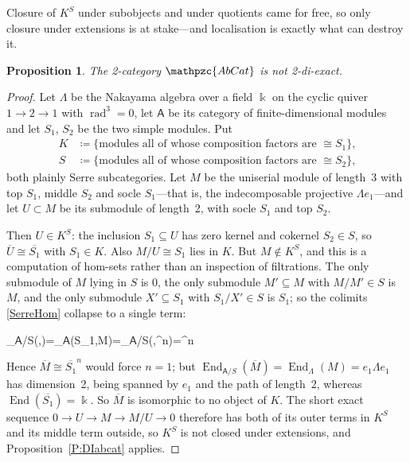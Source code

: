 \documentclass[reqno,a4paper]{amsart}
\numberwithin{equation}{section}
\theoremstyle{plain}
\newtheorem{proposition}[subsection]{Proposition}
\theoremstyle{definition}
\def\nameit#1{\textrm{#1}~}
\def\prox{\nameit{Proposition}}
\newenvironment{eqD*}{\begin{equation*}}{\end{equation*}\ignorespacesafterend}
\newcommand{\iso}{\cong}
\newcommand{\ov}[1]{\overline{#1}}
\newcommand{\catfont}[1]{\ensuremath{\mathpzc{#1}}\xspace}
\newcommand{\onecat}[1]{\ensuremath{\mathsf{#1}}\xspace}
\newcommand{\AbCat}{\catfont{AbCat}}
\renewcommand{\1}{\onecat{1}}
\DeclareMathOperator{\Hom}{Hom}
\DeclareMathOperator{\End}{End}
\begin{document}
Closure of \(K^{S}\) under subobjects and under quotients came for free, so only closure under extensions is at stake---and localisation is exactly what can destroy it.

\begin{proposition}\label{P:AbCatFails}
	The 2-category \(\AbCat\) is not 2-di-exact.
\end{proposition}

\begin{proof}
	Let \(\Lambda\) be the Nakayama algebra over a field \(\Bbbk\) on the cyclic quiver \(1\to2\to1\) with \(\operatorname{rad}^{3}=0\), let \(\onecat{A}\) be its category of finite-dimensional modules and let \(S_{1}\), \(S_{2}\) be the two simple modules. Put
	\begin{align*}
		K & \coloneq\{\text{modules all of whose composition factors are \(\iso S_{1}\)}\}\text{,} \\
		S & \coloneq\{\text{modules all of whose composition factors are \(\iso S_{2}\)}\}\text{,}
	\end{align*}
	both plainly Serre subcategories. Let \(M\) be the uniserial module of length~3 with top \(S_{1}\), middle \(S_{2}\) and socle \(S_{1}\)---that is, the indecomposable projective \(\Lambda e_{1}\)---and let \(U\subset M\) be its submodule of length~2, with socle \(S_{1}\) and top \(S_{2}\).

	Then \(U\in K^{S}\): the inclusion \(S_{1}\subseteq U\) has zero kernel and cokernel \(S_{2}\in S\), so \(\ov{U}\iso\ov{S_{1}}\) with \(S_{1}\in K\). Also \(M/U\iso S_{1}\) lies in \(K\). But \(M\notin K^{S}\), and this is a computation of hom-sets rather than an inspection of filtrations. The only submodule of \(M\) lying in \(S\) is \(0\), the only submodule \(M'\subseteq M\) with \(M/M'\in S\) is \(M\), and the only submodule \(X'\subseteq S_{1}\) with \(S_{1}/X'\in S\) is \(S_{1}\); so the colimits \eqref{SerreHom} collapse to a single term:
	\begin{eqD*}
		\Hom_{\onecat{A}/S}(\ov{S_{1}},\ov{M})=\Hom_{\onecat{A}}(S_{1},M)=\Bbbk\text{,}\qquad\Hom_{\onecat{A}/S}(\ov{S_{1}},\ov{S_{1}}^{n})=\Bbbk^{n}
	\end{eqD*}
	Hence \(\ov{M}\iso\ov{S_{1}}^{n}\) would force \(n=1\); but \(\End_{\onecat{A}/S}(\ov{M})=\End_{\Lambda}(M)=e_{1}\Lambda e_{1}\) has dimension~2, being spanned by \(e_{1}\) and the path of length~2, whereas \(\End(\ov{S_{1}})=\Bbbk\). So \(\ov{M}\) is isomorphic to no object of \(K\). The short exact sequence \(0\to U\to M\to M/U\to 0\) therefore has both of its outer terms in \(K^{S}\) and its middle term outside, so \(K^{S}\) is not closed under extensions, and \prox\ref{P:DIabcat} applies.
\end{proof}
\end{document}
